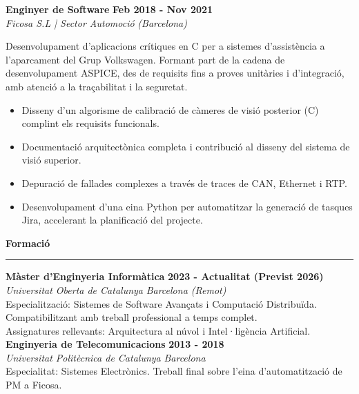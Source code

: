 \documentclass[11pt,a4paper]{article}
\newcommand{\cvsection}[1]{
    \vspace{0.5em}
    \noindent\textbf{\large #1}
    \vspace{0.5em}
    \hrule\vspace{0.5em}
}
\begin{document}
\begin{minipage}[t]{0.68\textwidth}
    \noindent
    \textbf{Enginyer de Software} \hfill \textbf{Feb 2018 - Nov 2021} \\
    \textit{Ficosa S.L | Sector Automoció} \hfill \textit{(Barcelona)} \vspace{4pt}
    
    Desenvolupament d'aplicacions crítiques en C per a sistemes d'assistència a l'aparcament del Grup Volkswagen. Formant part de la cadena de desenvolupament ASPICE, des de requisits fins a proves unitàries i d'integració, amb atenció a la traçabilitat i la seguretat.
    \begin{itemize}[leftmargin=*,topsep=2pt,itemsep=-1pt]
        \item Disseny d'un algorisme de calibració de càmeres de visió posterior (C) complint els requisits funcionals.
        \item Documentació arquitectònica completa i contribució al disseny del sistema de visió superior.
        \item Depuració de fallades complexes a través de traces de CAN, Ethernet i RTP.
        \item Desenvolupament d'una eina Python per automatitzar la generació de tasques Jira, accelerant la planificació del projecte.
    \end{itemize}
    
    \cvsection{Formació}
    \noindent
    \textbf{Màster d'Enginyeria Informàtica} \hfill \textbf{2023 - Actualitat (Previst 2026)} \\
    \textit{Universitat Oberta de Catalunya} \hfill \textit{Barcelona (Remot)} \\
    Especialització: Sistemes de Software Avançats i Computació Distribuïda.\\
    Compatibilitzant amb treball professional a temps complet.\\
    Assignatures rellevants: Arquitectura al núvol i Intel·ligència Artificial.\\
    \noindent
    \textbf{Enginyeria de Telecomunicacions} \hfill \textbf{2013 - 2018} \\
    \textit{Universitat Politècnica de Catalunya} \hfill \textit{Barcelona}\\
    Especialitat: Sistemes Electrònics. Treball final sobre l'eina d'automatització de PM a Ficosa.\\    
\end{minipage}
\hspace{0.02\textwidth}
\end{document}
